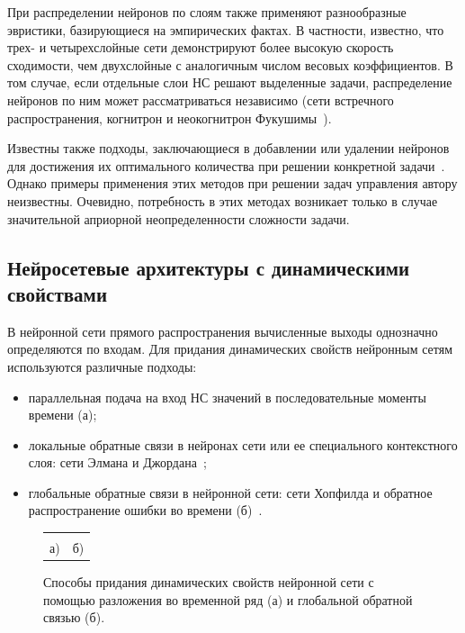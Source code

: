 При распределении нейронов по слоям также применяют разнообразные
эвристики, базирующиеся на эмпирических фактах.  В частности,
известно, что трех- и четырехслойные сети демонстрируют более высокую
скорость сходимости, чем двухслойные с аналогичным числом весовых
коэффициентов.  В том случае, если отдельные слои НС решают выделенные
задачи, распределение нейронов по ним может рассматриваться независимо
(сети встречного распространения, когнитрон и неокогнитрон
Фукушимы~\cite{wasser92}).

Известны также подходы, заключающиеся в добавлении или удалении
нейронов для достижения их оптимального количества при решении
конкретной задачи~\cite{gibb96}.  Однако примеры применения этих
методов при решении задач управления автору неизвестны.  Очевидно,
потребность в этих методах возникает только в случае значительной
априорной неопределенности сложности задачи.

\subsection{Нейросетевые архитектуры с динамическими свойствами}

В нейронной сети прямого распространения вычисленные выходы однозначно
определяются по входам.  Для придания динамических свойств нейронным
сетям используются различные подходы:

\begin{itemize}

\item
параллельная подача на вход НС значений в последовательные моменты
времени (а);

\item
локальные обратные связи в нейронах сети или ее специального
контекстного слоя: сети Элмана и Джордана~\cite{gibb96}\cite{golovko01};

\item
глобальные обратные связи в нейронной сети: сети Хопфилда и обратное
распространение ошибки во времени
(б)~\cite{wasser92}\cite{golovko01}.

\end{itemize}

\begin{figure}[h]
\centering
\begin{tabular}{cc}
\hbox{} &
\hbox{} \\
а) & б)\\
\end{tabular}
\caption{Способы придания динамических свойств нейронной сети с помощью
         разложения во временной ряд (а)
         и глобальной обратной связью (б).}
\label{fig:dynamic_nn}
\end{figure}

